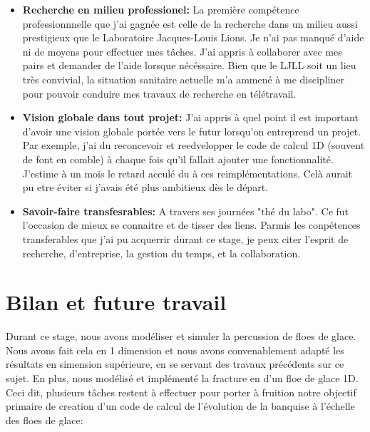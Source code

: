 \begin{itemize}
    \item \textbf{Recherche en milieu professionel:} La première compétence professionnnelle que j'ai gagnée est celle de la recherche dans un milieu aussi prestigieux que le Laboratoire Jacques-Louis Lions. Je n'ai pas manqué d'aide ni de moyens pour effectuer mes tâches. J'ai appris à collaborer avec mes pairs et demander de l'aide lorsque nécéssaire. Bien que le LJLL soit un lieu très convivial, la situation sanitaire actuelle m'a ammené à me discipliner pour pouvoir conduire mes travaux de recherche en télétravail.
    \item \textbf{Vision globale dans tout projet:} J'ai appris à quel point il est important d'avoir une vision globale portée vers le futur lorsqu'on entreprend un projet. Par exemple, j'ai du reconcevoir et reedvelopper le code de calcul 1D (souvent de font en comble) à chaque fois qu'il fallait ajouter une fonctionnalité. J'estime à un mois le retard acculé du à ces reimplémentations. Celà aurait pu etre éviter si j'avais été plus ambitieux dès le départ.
    \item \textbf{Savoir-faire transfesrables:} A travers ses journées "thé du labo". Ce fut l'occasion de mieux se connaitre et de tisser des liens. Parmis les conpétences transferables que j'ai pu acquerrir durant ce stage, je peux citer l'esprit de recherche, d'entreprise, la gestion du temps, et la collaboration.
\end{itemize}










\section{Bilan et future travail}

Durant ce stage, nous avons modéliser et simuler la percussion de floes de glace. Nous avons fait cela en 1 dimension et nous avons convenablement adapté les résultats en simension supérieure, en se servant des travaux précédents sur ce sujet. En plus, nous modélisé et implémenté la fracture en d'un floe de glace 1D. Ceci dit, plusieurs tâches restent à effectuer pour porter à fruition notre objectif primaire de creation d'un code de calcul de l’évolution de la banquise à l’échelle des floes de glace:

